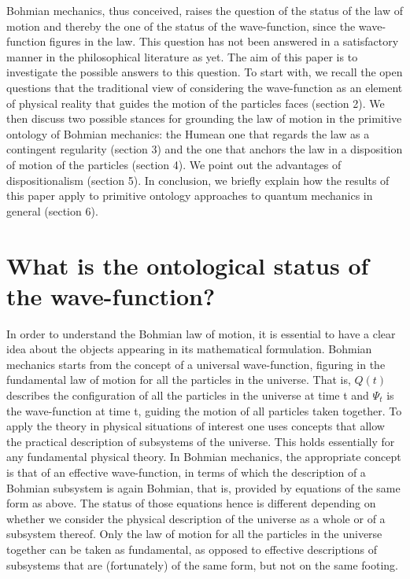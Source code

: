 \documentclass[12pt,a4paper]{article}
\theoremstyle{definition}
\begin{document}
Bohmian mechanics, thus conceived, raises the question of the status of the law of motion and thereby the one of the status of the wave-function, since the wave-function figures in the law. This question has not been answered in a satisfactory manner in the philosophical literature as yet. The aim of this paper is to investigate the possible answers to this question. To start with, we recall the open questions that the traditional view of considering the wave-function as an element of physical reality that guides the motion of the particles faces (section 2). We then discuss two possible stances for grounding the law of motion in the primitive ontology of Bohmian mechanics: the Humean one that regards the law as a contingent regularity (section 3) and the one that anchors the law in a disposition of motion of the particles (section 4). We point out the advantages of dispositionalism (section 5). In conclusion, we briefly explain how the results of this paper apply to primitive ontology approaches to quantum mechanics in general (section 6).

\section{What is the ontological status of the wave-function?}
In order to understand the Bohmian law of motion, it is essential to have a clear idea about the objects appearing in its mathematical formulation. Bohmian mechanics starts from the concept of a universal wave-function, figuring in the fundamental law of motion for all the particles in the universe. That is, $Q(t)$ describes the configuration of all the particles in the universe at time t and $\Psi_t$ is the wave-function at time t, guiding the motion of all particles taken together. To apply the theory in physical situations of interest one uses concepts that allow the practical description of subsystems of the universe. This holds essentially for any fundamental physical theory. In Bohmian mechanics, the appropriate concept is that of an effective wave-function, in terms of which the description of a Bohmian subsystem is again Bohmian, that is, provided by equations of the same form as above. The status of those equations hence is different depending on whether we consider the physical description of the universe as a whole or of a subsystem thereof. Only the law of motion for all the particles in the universe together can be taken as fundamental, as opposed to effective descriptions of subsystems that are (fortunately) of the same form, but not on the same footing.
\end{document}
